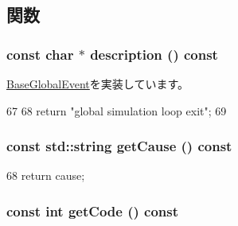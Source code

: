 \subsection{関数}
\hypertarget{classGlobalSimLoopExitEvent_a5a14fe478e2393ff51f02e9b7be27e00}{
\subsubsection[{description}]{\setlength{\rightskip}{0pt plus 5cm}const char $\ast$ description () const}}
\label{classGlobalSimLoopExitEvent_a5a14fe478e2393ff51f02e9b7be27e00}


\hyperlink{classBaseGlobalEvent_aaf0ee88413e805ebda5569f5c13d847f}{BaseGlobalEvent}を実装しています。


\begin{DoxyCode}
67 {
68     return "global simulation loop exit";
69 }
\end{DoxyCode}
\hypertarget{classGlobalSimLoopExitEvent_adf610f0866baa489220e6d9f9e24cb4d}{
\subsubsection[{getCause}]{\setlength{\rightskip}{0pt plus 5cm}const std::string getCause () const}}
\label{classGlobalSimLoopExitEvent_adf610f0866baa489220e6d9f9e24cb4d}



\begin{DoxyCode}
68 { return cause; }
\end{DoxyCode}
\hypertarget{classGlobalSimLoopExitEvent_a58a2e3d87f99241c0363c9765b3ef3e9}{
\subsubsection[{getCode}]{\setlength{\rightskip}{0pt plus 5cm}const int getCode () const}}
\label{classGlobalSimLoopExitEvent_a58a2e3d87f99241c0363c9765b3ef3e9}



